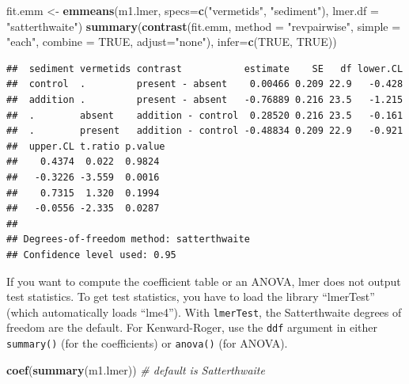 \documentclass[]{book}
\newenvironment{Shaded}{\begin{snugshade}}{\end{snugshade}}
\newcommand{\KeywordTok}[1]{\textcolor[rgb]{0.13,0.29,0.53}{\textbf{#1}}}
\newcommand{\DataTypeTok}[1]{\textcolor[rgb]{0.13,0.29,0.53}{#1}}
\newcommand{\StringTok}[1]{\textcolor[rgb]{0.31,0.60,0.02}{#1}}
\newcommand{\CommentTok}[1]{\textcolor[rgb]{0.56,0.35,0.01}{\textit{#1}}}
\newcommand{\OtherTok}[1]{\textcolor[rgb]{0.56,0.35,0.01}{#1}}
\newcommand{\NormalTok}[1]{#1}
\begin{document}
\begin{Shaded}
\begin{Highlighting}[]
\NormalTok{fit.emm <-}\StringTok{ }\KeywordTok{emmeans}\NormalTok{(m1.lmer, }
                   \DataTypeTok{specs=}\KeywordTok{c}\NormalTok{(}\StringTok{"vermetids"}\NormalTok{, }\StringTok{"sediment"}\NormalTok{),}
                   \DataTypeTok{lmer.df =} \StringTok{"satterthwaite"}\NormalTok{)}
\KeywordTok{summary}\NormalTok{(}\KeywordTok{contrast}\NormalTok{(fit.emm, }
                 \DataTypeTok{method =} \StringTok{"revpairwise"}\NormalTok{, }
                 \DataTypeTok{simple =} \StringTok{"each"}\NormalTok{,}
                 \DataTypeTok{combine =} \OtherTok{TRUE}\NormalTok{,}
                 \DataTypeTok{adjust=}\StringTok{"none"}\NormalTok{),}
        \DataTypeTok{infer=}\KeywordTok{c}\NormalTok{(}\OtherTok{TRUE}\NormalTok{, }\OtherTok{TRUE}\NormalTok{))}
\end{Highlighting}
\end{Shaded}

\begin{verbatim}
##  sediment vermetids contrast           estimate    SE   df lower.CL
##  control  .         present - absent    0.00466 0.209 22.9   -0.428
##  addition .         present - absent   -0.76889 0.216 23.5   -1.215
##  .        absent    addition - control  0.28520 0.216 23.5   -0.161
##  .        present   addition - control -0.48834 0.209 22.9   -0.921
##  upper.CL t.ratio p.value
##    0.4374  0.022  0.9824 
##   -0.3226 -3.559  0.0016 
##    0.7315  1.320  0.1994 
##   -0.0556 -2.335  0.0287 
## 
## Degrees-of-freedom method: satterthwaite 
## Confidence level used: 0.95
\end{verbatim}

If you want to compute the coefficient table or an ANOVA, lmer does not
output test statistics. To get test statistics, you have to load the
library ``lmerTest'' (which automatically loads ``lme4''). With
\texttt{lmerTest}, the Satterthwaite degrees of freedom are the default.
For Kenward-Roger, use the \texttt{ddf} argument in either
\texttt{summary()} (for the coefficients) or \texttt{anova()} (for
ANOVA).

\begin{Shaded}
\begin{Highlighting}[]
\KeywordTok{coef}\NormalTok{(}\KeywordTok{summary}\NormalTok{(m1.lmer)) }\CommentTok{# default is Satterthwaite}
\end{Highlighting}
\end{Shaded}
\end{document}
